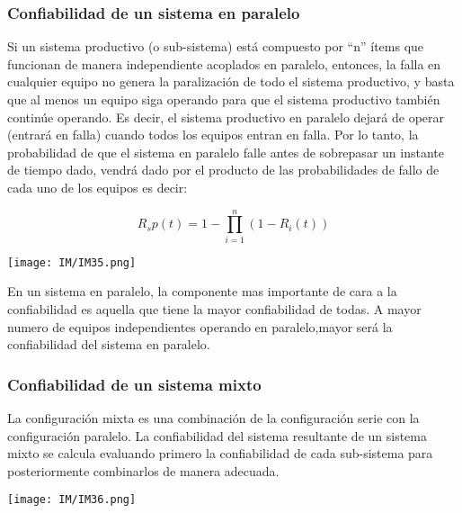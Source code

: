 \documentclass[
	12pt, %
	fleqn, %
	a4paper, %
	oneside, %
]{LegrandOrangeBook}
\begin{document}
\subsubsection{Confiabilidad de un sistema en paralelo}
Si un sistema productivo (o sub-sistema) está compuesto por ``n'' ítems que funcionan de manera independiente acoplados en paralelo, entonces, la falla en cualquier equipo no genera la paralización de todo el sistema productivo, y basta que al menos un equipo siga operando para que el sistema productivo también continúe operando. Es decir, el sistema productivo en paralelo dejará de operar (entrará en falla) cuando todos los equipos entran en falla. Por lo tanto, la probabilidad de que el sistema en paralelo falle antes de sobrepasar un instante de tiempo dado, vendrá dado por el producto de las probabilidades de fallo de cada uno de los equipos es decir: 
\begin{definition}
\begin{equation}
R_sp(t)=1-\prod_{i=1}^n(1-R_i(t))
\end{equation}
\begin{center}
\texttt{[image: IM/IM35.png]}
\end{center}
\end{definition}
\begin{remark}
En un sistema en paralelo, la componente mas importante de cara a la confiabilidad es aquella que tiene la mayor confiabilidad de todas. A mayor numero de equipos independientes operando en paralelo,mayor será la confiabilidad del sistema en paralelo.
\end{remark}
\subsubsection{Confiabilidad de un sistema mixto}
La configuración mixta es una combinación de la configuración serie con la configuración paralelo. La confiabilidad del sistema resultante de un sistema mixto se calcula evaluando primero la confiabilidad de cada sub-sistema para posteriormente combinarlos de manera adecuada.
\begin{center}
\texttt{[image: IM/IM36.png]}
\end{center}
\end{document}
